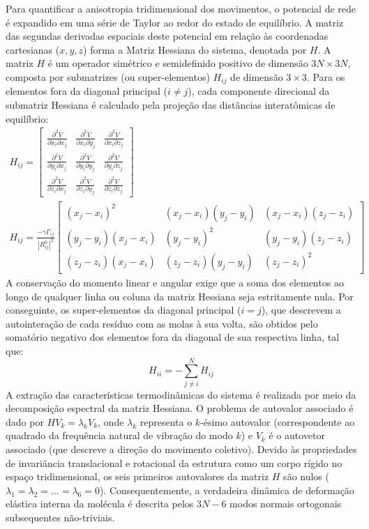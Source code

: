 \documentclass[12pt, a4paper]{article}
\theoremstyle{plain}
\theoremstyle{definition}
\theoremstyle{remark}
\newcommand{\ident}{\hspace{2em}}
\begin{document}
\ident Para quantificar a anisotropia tridimensional dos movimentos, o potencial de rede é expandido em uma série de Taylor ao redor do estado de equilíbrio. A matriz das segundas derivadas espaciais deste potencial em relação às coordenadas cartesianas ($x, y, z$) forma a Matriz Hessiana do sistema, denotada por $H$. A matriz $H$ é um operador simétrico e semidefinido positivo de dimensão $3N \times 3N$, composta por submatrizes (ou super-elementos) $H_{ij}$ de dimensão $3 \times 3$. Para os elementos fora da diagonal principal ($i \neq j$), cada componente direcional da submatriz Hessiana é calculado pela projeção das distâncias interatômicas de equilíbrio:
\begin{gather*}
    H_{ij} = \begin{bmatrix}
    \frac{\partial^2 V}{\partial x_i \partial x_j} & \frac{\partial^2 V}{\partial x_i \partial y_j} & \frac{\partial^2 V}{\partial x_i \partial z_j} \\
    \frac{\partial^2 V}{\partial y_i \partial x_j} & \frac{\partial^2 V}{\partial y_i \partial y_j} & \frac{\partial^2 V}{\partial y_i \partial z_j} \\
    \frac{\partial^2 V}{\partial z_i \partial x_j} & \frac{\partial^2 V}{\partial z_i \partial y_j} & \frac{\partial^2 V}{\partial z_i \partial z_j}
    \end{bmatrix}\\
    H_{ij} = \frac{-\gamma \Gamma_{ij}}{|R_{ij}^0|^2} \begin{bmatrix}
    (x_j - x_i)^2 & (x_j - x_i)(y_j - y_i) & (x_j - x_i)(z_j - z_i) \\
    (y_j - y_i)(x_j - x_i) & (y_j - y_i)^2 & (y_j - y_i)(z_j - z_i) \\
    (z_j - z_i)(x_j - x_i) & (z_j - z_i)(y_j - y_i) & (z_j - z_i)^2
    \end{bmatrix} \label{eq:hessian_off_diag}
\end{gather*}
\ident A conservação do momento linear e angular exige que a soma dos elementos ao longo de qualquer linha ou coluna da matriz Hessiana seja estritamente nula. Por conseguinte, os super-elementos da diagonal principal ($i = j$), que descrevem a autointeração de cada resíduo com as molas à sua volta, são obtidos pelo somatório negativo dos elementos fora da diagonal de sua respectiva linha, tal que:
\begin{equation*}
    H_{ii} = - \sum_{j \neq i}^{N} H_{ij} \label{eq:hessian_diag}
\end{equation*}
\ident A extração das características termodinâmicas do sistema é realizada por meio da decomposição espectral da matriz Hessiana. O problema de autovalor associado é dado por $H V_k = \lambda_k V_k$, onde $\lambda_k$ representa o $k$-ésimo autovalor (correspondente ao quadrado da frequência natural de vibração do modo $k$) e $V_k$ é o autovetor associado (que descreve a direção do movimento coletivo). Devido às propriedades de invariância translacional e rotacional da estrutura como um corpo rígido no espaço tridimensional, os seis primeiros autovalores da matriz $H$ são nulos ($\lambda_1 = \lambda_2 = \dots = \lambda_6 = 0$). Consequentemente, a verdadeira dinâmica de deformação elástica interna da molécula é descrita pelos $3N - 6$ modos normais ortogonais subsequentes não-triviais.
\end{document}
